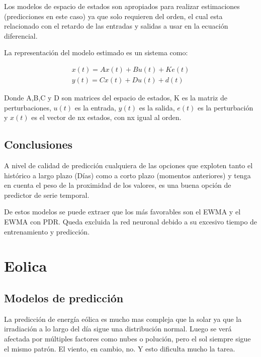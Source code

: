Los modelos de espacio de estados son apropiados para realizar estimaciones (predicciones en este caso) ya que solo requieren del orden, el cual esta relacionado con el retardo de las entradas y salidas a usar en la ecuación diferencial.

La representación del modelo estimado es un sistema como:

\begin{align}
	x(t) = Ax(t) + Bu(t) + Ke(t) \\
	y(t) = Cx(t) + Du(t) + d(t)
\end{align}

Donde A,B,C y D son matrices del espacio de estados, K es la matriz de perturbaciones, $u(t)$ es la entrada, $y(t)$ es la salida, $e(t)$ es la perturbación y $x(t)$ es el vector de nx estados, con nx igual al orden.



\subsection{Conclusiones} 
\label{sub:conclusiones}

A nivel de calidad de predicción cualquiera de las opciones que exploten tanto el histórico a largo plazo (Días) como a corto plazo (momentos anteriores) y tenga en cuenta el peso de la proximidad de los valores, es una buena opción de predictor de serie temporal.

De estos modelos se puede extraer que los más favorables son el EWMA y el EWMA con PDR. Queda excluida la red neuronal debido a su excesivo tiempo de entrenamiento y predicción. 




\section{Eolica} 
\label{sec:eolica}

\subsection{Modelos de predicción} 
\label{sub:coneptos_basicos}

La predicción de energía eólica es mucho mas compleja que la solar ya que la irradiación a lo largo del día sigue una distribución normal. Luego se verá afectada por múltiples factores como nubes o polución, pero el sol siempre sigue el mismo patrón. El viento, en cambio, no. Y esto dificulta mucho la tarea.

